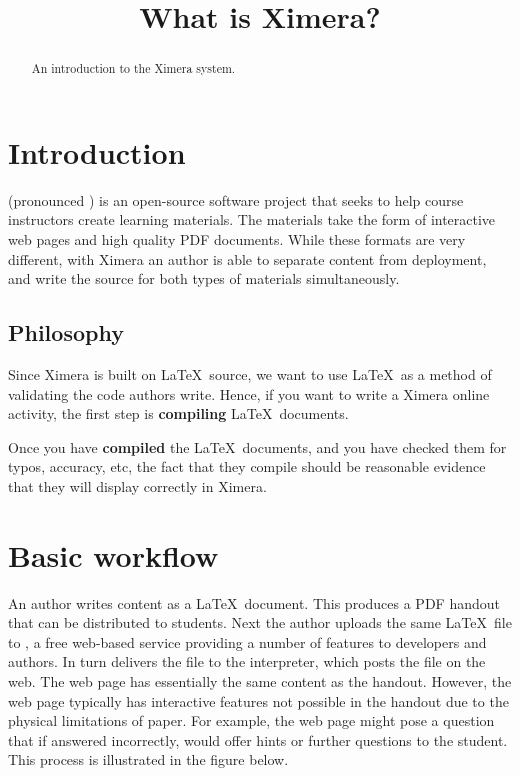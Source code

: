 \documentclass{ximera}
\title{What is Ximera?}
\begin{document}
\begin{abstract}
An introduction to the Ximera system.
\end{abstract}
\maketitle


\section{Introduction}

 (pronounced ) is an
open-source software project that seeks to help course instructors
create learning materials.  The materials take the form of interactive
web pages and high quality PDF documents.  While these formats are
very different, with Ximera an author is able to separate content from
deployment, and write the source for both types of materials
simultaneously.

\subsection{Philosophy}

Since Ximera is built on \LaTeX\ source, we want to use \LaTeX\ as a
method of validating the code authors write. Hence, if you want to
write a Ximera online activity, the first step is \textbf{compiling}
\LaTeX\ documents.

Once you have \textbf{compiled} the \LaTeX\ documents, and you have
checked them for typos, accuracy, etc, the fact that they compile
should be reasonable evidence that they will display correctly in
Ximera.





\section{Basic workflow}

An author writes content as a \LaTeX\ document.  This produces a PDF
handout that can be distributed to students.  Next the author uploads
the same \LaTeX\ file to , a free
web-based service providing a number of features to developers and
authors.  In turn  delivers the
file to the  interpreter, which
posts the file on the web.  The web page has essentially the same
content as the handout.  However, the web page typically has
interactive features not possible in the handout due to the physical
limitations of paper.  For example, the web page might pose a question
that if answered incorrectly, would offer hints or further questions
to the student.  This process is illustrated in the figure below.
\end{document}
